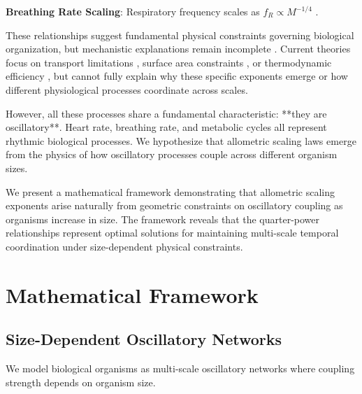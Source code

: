 \documentclass[twocolumn]{article}
\begin{document}
\textbf{Breathing Rate Scaling}: Respiratory frequency scales as $f_R \propto M^{-1/4}$ \citep{stahl1967scaling}.

These relationships suggest fundamental physical constraints governing biological organization, but mechanistic explanations remain incomplete \citep{savage2004quantitative}. Current theories focus on transport limitations \citep{west1997general}, surface area constraints \citep{schmidt1984scaling}, or thermodynamic efficiency \citep{brown2004toward}, but cannot fully explain why these specific exponents emerge or how different physiological processes coordinate across scales.

However, all these processes share a fundamental characteristic: **they are oscillatory**. Heart rate, breathing rate, and metabolic cycles all represent rhythmic biological processes. We hypothesize that allometric scaling laws emerge from the physics of how oscillatory processes couple across different organism sizes.

We present a mathematical framework demonstrating that allometric scaling exponents arise naturally from geometric constraints on oscillatory coupling as organisms increase in size. The framework reveals that the quarter-power relationships represent optimal solutions for maintaining multi-scale temporal coordination under size-dependent physical constraints.

\section{Mathematical Framework}

\subsection{Size-Dependent Oscillatory Networks}

We model biological organisms as multi-scale oscillatory networks where coupling strength depends on organism size.
\end{document}
